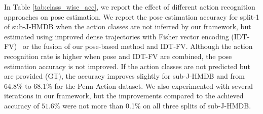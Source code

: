 \documentclass[a4paper, 10pt, conference]{ieeeconf}      \usepackage{FG2017}
\begin{document}
In Table \ref{tab:class_wise_acc}, we report the effect of different action recognition approaches on pose estimation. We report the pose estimation accuracy for split-1 of sub-J-HMDB when the action classes are not inferred by our framework, but estimated using improved dense trajectories with Fisher vector encoding (IDT-FV)~\cite{wang2013action} or the fusion of our pose-based method and IDT-FV. Although the action recognition rate is higher when pose and IDT-FV are combined, the pose estimation accuracy is not improved. If the action classes are not predicted but are provided (GT),
the accuracy improves slightly for sub-J-HMDB and
from 64.8\% to 68.1\% for the Penn-Action dataset. We also experimented with several iterations in our framework, but the improvements compared to the achieved accuracy of $51.6\%$ were not more than 0.1\% on all three splits of sub-J-HMDB.  


\begin{table}[t]
  \centering
  \footnotesize
\def\arraystretch{1}

  \caption{Comparison of action recognition accuracy with the state-of-the-art approaches on sub-J-HMDB and Penn-Action datasets. }
  \label{tab:AR_JHMDB}
\end{table}
\end{document}
